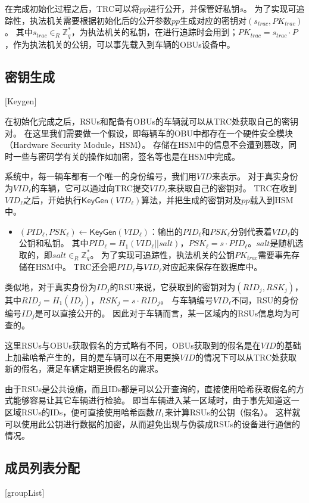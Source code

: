 在完成初始化过程之后，TRC可以将$pp$进行公开，并保管好私钥$s$。
为了实现可追踪性，执法机关需要根据初始化后的公开参数$pp$生成对应的密钥对$(s_{trac},PK_{trac})$。
其中$s_{trac}\in_R\mathbb{Z}_q^*$，为执法机关的私钥，在进行追踪时会用到；$PK_{trac}=s_{trac}\cdot P$，作为执法机关的公钥，可以事先载入到车辆的OBUs设备中。

\subsection{密钥生成}[Keygen]

在初始化完成之后，RSUs和配备有OBUs的车辆就可以从TRC处获取自己的密钥对。
在这里我们需要做一个假设，即每辆车的OBU中都存在一个硬件安全模块（Hardware Security Module，HSM）\cite{tzeng2017enhancing}。
存储在HSM中的信息不会遭到篡改，同时一些与密码学有关的操作如加密，签名等也是在HSM中完成。

系统中，每一辆车都有一个唯一的身份编号，我们用$VID$来表示。
对于真实身份为$VID_\ell$的车辆，它可以通过向TRC提交$VID_\ell$来获取自己的密钥对。
TRC在收到$VID_\ell$之后，开始执行$\mathsf{KeyGen}(VID_\ell)$算法，并把生成的密钥对及$pp$载入到HSM中。

\begin{itemize}
  \item $(PID_\ell,PSK_\ell)\leftarrow\mathsf{KeyGen}(VID_\ell)$：输出的$PID_\ell$和$PSK_\ell$分别代表着$VID_\ell$的公钥和私钥。
  其中$PID_\ell=H_1(VID_\ell||salt)$，$PSK_\ell=s\cdot PID_\ell$。$salt$是随机选取的，即$salt\in_R\mathbb{Z}_q^*$。
  为了实现可追踪性，执法机关的公钥$PK_{trac}$需要事先存储在HSM中。
  TRC还会把$PID_\ell$与$VID_\ell$对应起来保存在数据库中。
\end{itemize}

类似地，对于真实身份为$ID_j$的RSU来说，它获取到的密钥对为$(RID_j,RSK_j)$，其中$RID_j=H_1(ID_j)$，$RSK_j=s\cdot RID_j$。
与车辆编号$VID_\ell$不同，RSU的身份编号$ID_j$是可以直接公开的。
因此对于车辆而言，某一区域内的RSUs信息均为可查的。

这里RSUs与OBUs获取假名的方式略有不同，OBUs获取到的假名是在$VID$的基础上加盐哈希产生的，目的是车辆可以在不用更换$VID$的情况下可以从TRC处获取新的假名，满足车辆定期更换假名的需求。

由于RSUs是公共设施，而且IDs都是可以公开查询的，直接使用哈希获取假名的方式能够容易让其它车辆进行检验。
即当车辆进入某一区域时，由于事先知道这一区域RSUs的IDs，便可直接使用哈希函数$H_1$来计算RSUs的公钥（假名）。
这样就可以使用此公钥进行数据的加密，从而避免出现与伪装成RSUs的设备进行通信的情况。

\subsection{成员列表分配}[groupList]

